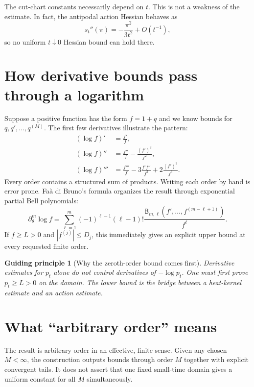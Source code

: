 \documentclass[11pt]{article}
\newtheorem{principle}{Guiding principle}[section]
\theoremstyle{definition}
\begin{document}
The cut-chart constants necessarily depend on $t$.  This is not a weakness of
the estimate.  In fact, the antipodal action Hessian behaves as
\begin{equation}\label{expl:eq:antipode-hessian}
 s_t''(\pi)=-\frac{\pi^2}{3t^2}+O(t^{-1}),
\end{equation}
so no uniform $t\downarrow0$ Hessian bound can hold there.

\section{How derivative bounds pass through a logarithm}

Suppose a positive function has the form $f=1+q$ and we know bounds for
$q,q',\ldots,q^{(M)}$.  The first few derivatives illustrate the pattern:
\begin{align*}
 (\log f)'&=\frac{f'}{f},\\
 (\log f)''&=\frac{f''}{f}-\frac{(f')^2}{f^2},\\
 (\log f)'''&=\frac{f'''}{f}
 -3\frac{f'f''}{f^2}+2\frac{(f')^3}{f^3}.
\end{align*}
Every order contains a structured sum of products.  Writing each order by
hand is error prone.  Fa\`a di Bruno's formula organizes the result through
exponential partial Bell polynomials:
\begin{equation}\label{expl:eq:bell}
 \partial_\theta^m\log f
 =\sum_{\ell=1}^m(-1)^{\ell-1}(\ell-1)!
 \frac{\mathsf B_{m,\ell}(f',\ldots,f^{(m-\ell+1)})}{f^\ell}.
\end{equation}
If $f\ge L>0$ and $|f^{(j)}|\le D_j$, this immediately gives an explicit
upper bound at every requested finite order.

\begin{principle}[Why the zeroth-order bound comes first]
Derivative estimates for $p_t$ alone do not control derivatives of
$-\log p_t$.  One must first prove $p_t\ge L>0$ on the domain.  The lower
bound is the bridge between a heat-kernel estimate and an action estimate.
\end{principle}

\section{What ``arbitrary order'' means}

The result is arbitrary-order in an effective, finite sense.  Given any
chosen $M<\infty$, the construction outputs bounds through order $M$ together
with explicit convergent tails.  It does not assert that one fixed small-time
domain gives a uniform constant for all $M$ simultaneously.
\end{document}
